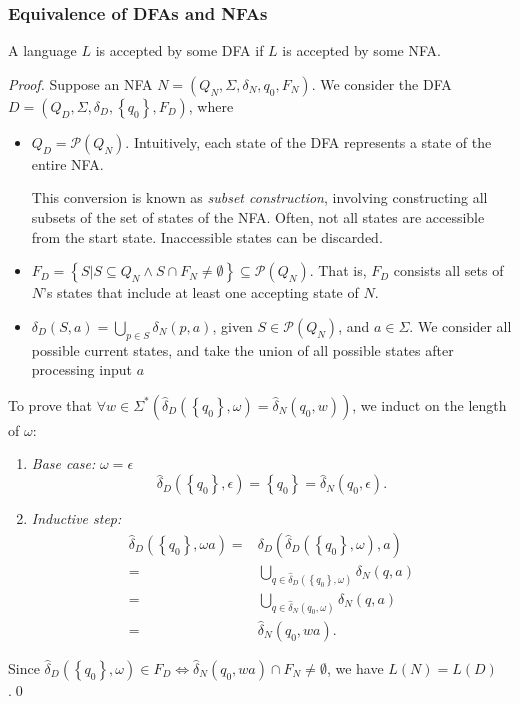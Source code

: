 \subsubsection{Equivalence of DFAs and NFAs}
\begin{theorem}
  A language $L$ is accepted by some DFA if $L$ is accepted by some NFA\@.
\end{theorem}
\begin{proof}
Suppose an NFA $N=\left( Q_N,\Sigma,\delta_N,q_0,F_N \right) $. We consider the
DFA $D=\left( Q_D,\Sigma,\delta_D,\left\{ q_0 \right\} ,F_D \right) $, where
\begin{itemize}
  \item $Q_D =\mathcal{P}\left( Q_N \right) $. Intuitively, each state of the
    DFA represents a state of the entire NFA\@.
    \begin{remark}
      This conversion is known as \textit{subset construction}, involving
      constructing all subsets of the set of states of the NFA\@. Often, not all
      states are accessible from the start state. Inaccessible states can be
      discarded.
    \end{remark}
  \item $F_D = \left\{ S| S\subseteq Q_N \wedge S\cap F_N\neq
    \emptyset\right\}\subseteq \mathcal{P}(Q_N)$. That is, $F_D$ consists all
    sets of $N$'s states that include at least one accepting state of $N$.
  \item $\delta_D\left( S,a \right) =\bigcup_{p\in S} \delta_N\left( p,a
    \right) $, given $S\in \mathcal{P}\left( Q_N \right)$, and $ a\in \Sigma$.
    We consider all possible current states, and take the union of all possible
    states after processing input $a$
\end{itemize}
To prove that $\forall w\in \Sigma^{*}\left( \hat{\delta}_D\left( \left\{ q_0 \right\},\omega \right)=\hat{\delta}_N\left( q_0,w \right) \right) $, we induct on the length of $\omega$:
\begin{enumerate}
  \item \textit{Base case:} $\omega=\epsilon$
    \[\hat{\delta}_D\left( \left\{ q_0  \right\} ,\epsilon  \right)=\left\{ q_0
    \right\}=\hat{\delta}_N\left( q_0,\epsilon \right).\]
  \item \textit{Inductive step: }
    \begin{align*}
      \hat{\delta}_D\left( \left\{ q_0 \right\},\omega a\right)=&\delta_D\left(
      \hat{\delta}_D\left( \left\{ q_0 \right\},\omega \right) ,a \right)\\
        =&\bigcup_{q\in \hat{\delta}_D\left( \left\{ q_0 \right\} ,\omega\right)} \delta_N\left( q,a \right) \\
        =&\bigcup_{q\in \hat{\delta}_N\left(  q_0 ,\omega\right)} \delta_N\left( q,a \right) \\
        =&\hat{\delta}_N\left( q_0,wa \right).
    \end{align*}
\end{enumerate}
Since $\hat{\delta}_D\left( \left\{ q_0 \right\} ,\omega\right)\in F_D\iff\hat{\delta}_N\left( q_0,wa \right)\cap F_N \neq \emptyset$, we have $L(N)=L(D)$.\qed%
\end{proof}

